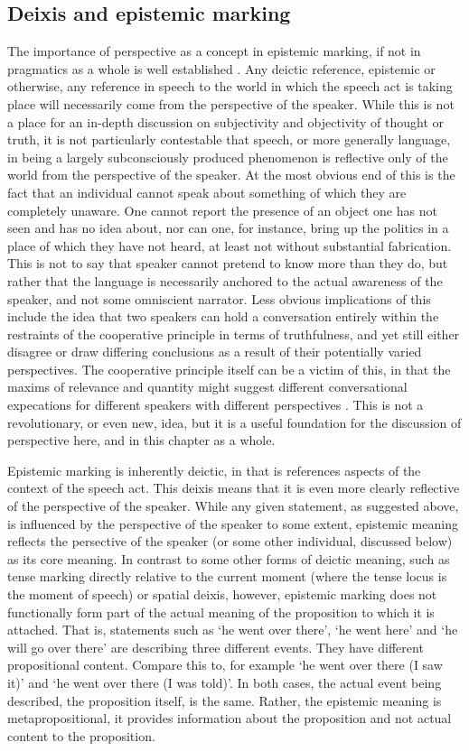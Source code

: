 \subsection{Deixis and epistemic marking}
The importance of perspective as a concept in epistemic marking, if not in pragmatics as a whole is well established \cite{Evans2005View}. Any deictic reference, epistemic or otherwise, any reference in speech to the world in which the speech act is taking place will necessarily come from the perspective of the speaker. While this is not a place for an in-depth discussion on subjectivity and objectivity of thought or truth, it is not particularly contestable that speech, or more generally language, in being a largely subconsciously produced phenomenon is reflective only of the world from the perspective of the speaker. At the most obvious end of this is the fact that an individual cannot speak about something of which they are completely unaware. One cannot report the presence of an object one has not seen and has no idea about, nor can one, for instance, bring up the politics in a place of which they have not heard, at least not without substantial fabrication. This is not to say that speaker cannot pretend to know more than they do, but rather that the language is necessarily anchored to the actual awareness of the speaker, and not some omniscient narrator. Less obvious implications of this include the idea that two speakers can hold a conversation entirely within the restraints of the cooperative principle in terms of truthfulness, and yet still either disagree or draw differing conclusions as a result of their potentially varied perspectives. The cooperative principle itself can be a victim of this, in that the maxims of relevance and quantity might suggest different conversational expecations for different speakers with different perspectives \cite{BodnarukForthcoming}. This is not a revolutionary, or even new, idea, but it is a useful foundation for the discussion of perspective here, and in this chapter as a whole.

Epistemic marking is inherently deictic, in that is references aspects of the context of the speech act. This deixis means that it is even more clearly reflective of the perspective of the speaker. While any given statement, as suggested above, is influenced by the perspective of the speaker to some extent, epistemic meaning reflects the persective of the speaker (or some other individual, discussed below) as its core meaning. In contrast to some other forms of deictic meaning, such as tense marking directly relative to the current moment (where the tense locus is the moment of speech) or spatial deixis, however, epistemic marking does not functionally form part of the actual meaning of the proposition to which it is attached. That is, statements such as `he went over there', `he went here' and `he will go over there' are describing three different events. They have different propositional content. Compare this to, for example `he went over there (I saw it)' and `he went over there (I was told)'. In both cases, the actual event being described, the proposition itself, is the same. Rather, the epistemic meaning is metapropositional, it provides information about the proposition and not actual content to the proposition.

